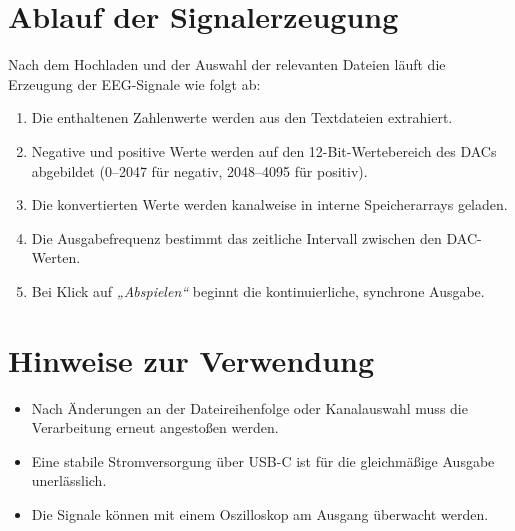 \section{Ablauf der Signalerzeugung}

Nach dem Hochladen und der Auswahl der relevanten Dateien läuft die Erzeugung der EEG-Signale wie folgt ab:

\begin{enumerate}
  \item Die enthaltenen Zahlenwerte werden aus den Textdateien extrahiert.
  \item Negative und positive Werte werden auf den 12-Bit-Wertebereich des DACs abgebildet (0–2047 für negativ, 2048–4095 für positiv).
  \item Die konvertierten Werte werden kanalweise in interne Speicherarrays geladen.
  \item Die Ausgabefrequenz bestimmt das zeitliche Intervall zwischen den DAC-Werten.
  \item Bei Klick auf \textit{„Abspielen“} beginnt die kontinuierliche, synchrone Ausgabe.
\end{enumerate}

\section{Hinweise zur Verwendung}

\begin{itemize}
  \item Nach Änderungen an der Dateireihenfolge oder Kanalauswahl muss die Verarbeitung erneut angestoßen werden.
  \item Eine stabile Stromversorgung über USB-C ist für die gleichmäßige Ausgabe unerlässlich.
  \item Die Signale können mit einem Oszilloskop am Ausgang überwacht werden.
\end{itemize}
